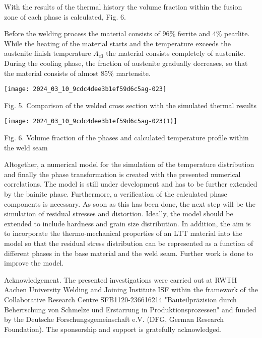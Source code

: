 \documentclass[10pt]{article}
\begin{document}
With the results of the thermal history the volume fraction within the fusion zone of each phase is calculated, Fig. 6.

Before the welding process the material consists of $96 \%$ ferrite and $4 \%$ pearlite. While the heating of the material starts and the temperature exceeds the austenite finish temperature $A_{c 3}$ the material consists completely of austenite. During the cooling phase, the fraction of austenite gradually decreases, so that the material consists of almost $85 \%$ martensite.

\begin{center}
\texttt{[image: 2024\_03\_10\_9cdc4dee3b1ef59d6c5ag-023]}
\end{center}

Fig. 5. Comparison of the welded cross section with the simulated thermal results

\begin{center}
\texttt{[image: 2024\_03\_10\_9cdc4dee3b1ef59d6c5ag-023(1)]}
\end{center}

Fig. 6. Volume fraction of the phases and calculated temperature profile within the weld seam

Altogether, a numerical model for the simulation of the temperature distribution and finally the phase transformation is created with the presented numerical correlations. The model is still under development and has to be further extended by the bainite phase. Furthermore, a verification of the calculated phase components is necessary. As soon as this has been done, the next step will be the simulation of residual stresses and distortion. Ideally, the model should be extended to include hardness and grain size distribution. In addition, the aim is to incorporate the thermo-mechanical properties of an LTT material into the model so that the residual stress distribution can be represented as a function of different phases in the base material and the weld seam. Further work is done to improve the model.

Acknowledgement. The presented investigations were carried out at RWTH Aachen University Welding and Joining Institute ISF within the framework of the Collaborative Research Centre SFB1120-236616214 "Bauteilpräzision durch Beherrschung von Schmelze und Erstarrung in Produktionsprozessen" and funded by the Deutsche Forschungsgemeinschaft e.V. (DFG, German Research Foundation). The sponsorship and support is gratefully acknowledged.
\end{document}
